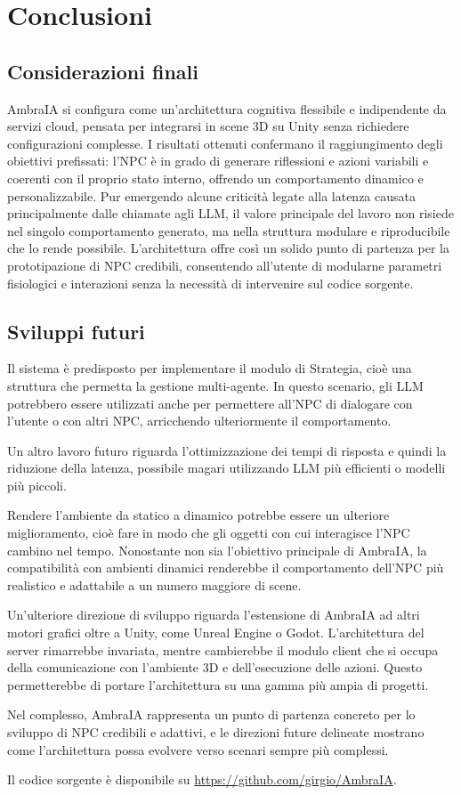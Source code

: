\chapter{Conclusioni} 
\label{cap:conclusioni}

\section{Considerazioni finali}

AmbraIA si configura come un'architettura cognitiva flessibile e indipendente da servizi cloud, pensata per integrarsi in scene 3D su Unity senza richiedere configurazioni complesse. I risultati ottenuti confermano il raggiungimento degli obiettivi prefissati: l'NPC è in grado di generare riflessioni e azioni variabili e coerenti con il proprio stato interno, offrendo un comportamento dinamico e personalizzabile. Pur emergendo alcune criticità legate alla latenza causata principalmente dalle chiamate agli LLM, il valore principale del lavoro non risiede nel singolo comportamento generato, ma nella struttura modulare e riproducibile che lo rende possibile. L'architettura offre così un solido punto di partenza per la prototipazione di NPC credibili, consentendo all'utente di modularne parametri fisiologici e interazioni senza la necessità di intervenire sul codice sorgente.

\section{Sviluppi futuri}

Il sistema è predisposto per implementare il modulo di Strategia, cioè una struttura che permetta la gestione multi-agente. In questo scenario, gli LLM potrebbero essere utilizzati anche per permettere all'NPC di dialogare con l'utente o con altri NPC, arricchendo ulteriormente il comportamento.

Un altro lavoro futuro riguarda l'ottimizzazione dei tempi di risposta e quindi la riduzione della latenza, possibile magari utilizzando LLM più efficienti o modelli più piccoli.

Rendere l'ambiente da statico a dinamico potrebbe essere un ulteriore miglioramento, cioè fare in modo che gli oggetti con cui interagisce l'NPC cambino nel tempo. Nonostante non sia l'obiettivo principale di AmbraIA, la compatibilità con ambienti dinamici renderebbe il comportamento dell'NPC più realistico e adattabile a un numero maggiore di scene.

Un'ulteriore direzione di sviluppo riguarda l'estensione di AmbraIA ad altri motori grafici oltre a Unity, come Unreal Engine o Godot. L'architettura del server rimarrebbe invariata, mentre cambierebbe il modulo client che si occupa della comunicazione con l'ambiente 3D e dell'esecuzione delle azioni. Questo permetterebbe di portare l'architettura su una gamma più ampia di progetti.

Nel complesso, AmbraIA rappresenta un punto di partenza concreto per lo sviluppo di NPC credibili e adattivi, e le direzioni future delineate mostrano come l'architettura possa evolvere verso scenari sempre più complessi.

Il codice sorgente è disponibile su \url{https://github.com/girgio/AmbraIA}.

